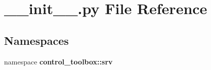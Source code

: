 \section{\-\_\-\-\_\-init\-\_\-\-\_\-.\-py \-File \-Reference}
\label{srv_2____init_____8py}
\subsection*{\-Namespaces}
\begin{DoxyCompactItemize}
\item 
namespace {\bf control\-\_\-toolbox\-::srv}
\end{DoxyCompactItemize}
